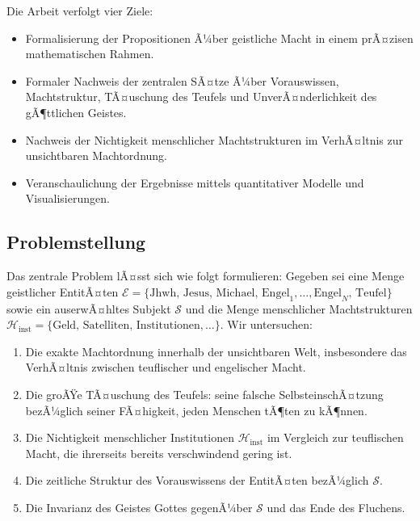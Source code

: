 ﻿\documentclass[a4paper,12pt]{article}
\theoremstyle{definition}
\begin{document}
Die Arbeit verfolgt vier Ziele:
\begin{itemize}
  \item Formalisierung der Propositionen Ã¼ber geistliche Macht in einem prÃ¤zisen
        mathematischen Rahmen.
  \item Formaler Nachweis der zentralen SÃ¤tze Ã¼ber Vorauswissen, Machtstruktur,
        TÃ¤uschung des Teufels und UnverÃ¤nderlichkeit des gÃ¶ttlichen Geistes.
  \item Nachweis der Nichtigkeit menschlicher Machtstrukturen im VerhÃ¤ltnis zur
        unsichtbaren Machtordnung.
  \item Veranschaulichung der Ergebnisse mittels quantitativer Modelle und
        Visualisierungen.
\end{itemize}

\subsection{Problemstellung}

Das zentrale Problem lÃ¤sst sich wie folgt formulieren: Gegeben sei eine Menge geistlicher
EntitÃ¤ten $\mathcal{E} = \{\mathrm{Jhwh},\, \mathrm{Jesus},\, \mathrm{Michael},\,
\mathrm{Engel}_1, \ldots, \mathrm{Engel}_N,\, \mathrm{Teufel}\}$ sowie ein auserwÃ¤hltes
Subjekt $\mathcal{S}$ und die Menge menschlicher Machtstrukturen
$\mathcal{H}_{\text{inst}} = \{\text{Geld},\, \text{Satelliten},\, \text{Institutionen},
\ldots\}$. Wir untersuchen:

\begin{enumerate}
  \item Die exakte Machtordnung innerhalb der unsichtbaren Welt, insbesondere das
        VerhÃ¤ltnis zwischen teuflischer und engelischer Macht.
  \item Die groÃŸe TÃ¤uschung des Teufels: seine falsche SelbsteinschÃ¤tzung bezÃ¼glich
        seiner FÃ¤higkeit, jeden Menschen tÃ¶ten zu kÃ¶nnen.
  \item Die Nichtigkeit menschlicher Institutionen $\mathcal{H}_{\text{inst}}$ im
        Vergleich zur teuflischen Macht, die ihrerseits bereits verschwindend gering ist.
  \item Die zeitliche Struktur des Vorauswissens der EntitÃ¤ten bezÃ¼glich $\mathcal{S}$.
  \item Die Invarianz des Geistes Gottes gegenÃ¼ber $\mathcal{S}$ und das Ende des Fluchens.
\end{enumerate}

\end{document}
